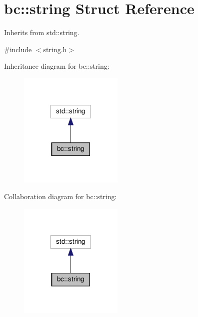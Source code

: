 \hypertarget{structbc_1_1string}{}\section{bc\+:\+:string Struct Reference}
\label{structbc_1_1string}


Inherits from std\+::string.  




{\ttfamily \#include $<$string.\+h$>$}



Inheritance diagram for bc\+:\+:string\+:\nopagebreak
\begin{figure}[H]
\begin{center}
\leavevmode
\includegraphics[width=140pt]{structbc_1_1string__inherit__graph}
\end{center}
\end{figure}


Collaboration diagram for bc\+:\+:string\+:\nopagebreak
\begin{figure}[H]
\begin{center}
\leavevmode
\includegraphics[width=140pt]{structbc_1_1string__coll__graph}
\end{center}
\end{figure}
